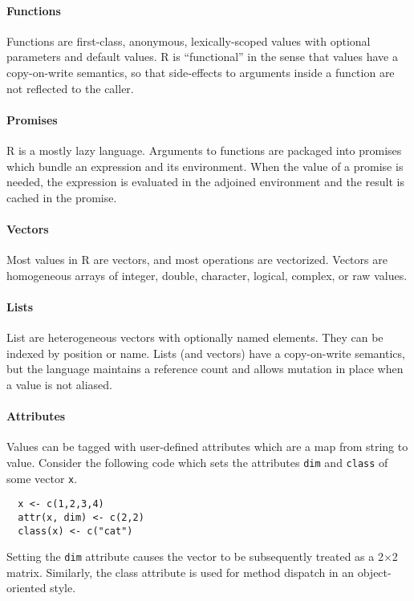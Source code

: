 \documentclass[10pt,review,sigplan,anonymous=true,authorversion=true,nonacm=true]{acmart}
\newcommand{\code}[1]{\lstinline |#1|\xspace}
\renewcommand{\c}[1]{\lstinline |#1|\xspace}
\begin{document}
\paragraph{Functions} Functions are first-class, anonymous, lexically-scoped values
with optional parameters and default values. R is ``functional'' in the sense
that values have a copy-on-write semantics, so that side-effects to arguments
inside a function are not reflected to the caller.

\paragraph{Promises} R is a mostly lazy language.  Arguments to functions are
packaged into promises which bundle an expression and its environment. When the
value of a promise is needed, the expression is evaluated in the adjoined
environment and the result is cached in the promise.

\paragraph{Vectors}  Most values in R are vectors, and most operations are
vectorized. Vectors are homogeneous arrays of integer, double,
character, logical, complex, or raw values.

\paragraph{Lists} List are heterogeneous vectors with optionally named elements.
They can be indexed by position or name. Lists (and vectors) have a
copy-on-write semantics, but the language maintains a reference count and allows
mutation in place when a value is not aliased.


\paragraph{Attributes}
Values can be tagged with user-defined attributes which are a map from string to
value. Consider the following code which sets the attributes \code{dim} and
\c{class} of some vector \code{x}.

\begin{lstlisting}
  x <- c(1,2,3,4)
  attr(x, dim) <- c(2,2)
  class(x) <- c("cat")
\end{lstlisting}

Setting the \code{dim} attribute causes the vector to be subsequently treated as
a 2$\times$2 matrix. Similarly, the class attribute is used for method dispatch
in an object-oriented style.
\end{document}

